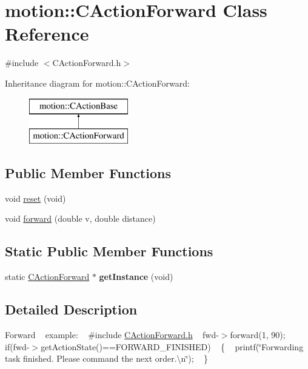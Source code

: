 \hypertarget{classmotion_1_1CActionForward}{}\section{motion\+:\+:C\+Action\+Forward Class Reference}
\label{classmotion_1_1CActionForward}


{\ttfamily \#include $<$C\+Action\+Forward.\+h$>$}

Inheritance diagram for motion\+:\+:C\+Action\+Forward\+:\begin{figure}[H]
\begin{center}
\leavevmode
\includegraphics[height=2.000000cm]{classmotion_1_1CActionForward}
\end{center}
\end{figure}
\subsection*{Public Member Functions}
\begin{DoxyCompactItemize}
\item 
void \mbox{\hyperlink{classmotion_1_1CActionForward_af7c72ffee0c2f41c8608259ef3268f23}{reset}} (void)
\item 
void \mbox{\hyperlink{classmotion_1_1CActionForward_abc4d3b39f49514f9d3f64a92393aa6d2}{forward}} (double v, double distance)
\end{DoxyCompactItemize}
\subsection*{Static Public Member Functions}
\begin{DoxyCompactItemize}
\item 
\mbox{\label{classmotion_1_1CActionForward_a7820340aa671aaf37c16b945f023b82f}} 
static \mbox{\hyperlink{classmotion_1_1CActionForward}{C\+Action\+Forward}} $\ast$ {\bfseries get\+Instance} (void)
\end{DoxyCompactItemize}


\subsection{Detailed Description}
Forward ~\newline
 example\+: ~\newline
 \#include \mbox{\hyperlink{CActionForward_8h}{C\+Action\+Forward.\+h}} ~\newline
 fwd-\/$>$forward(1, 90); ~\newline
if(fwd-\/$>$get\+Action\+State()==F\+O\+R\+W\+A\+R\+D\+\_\+\+F\+I\+N\+I\+S\+H\+ED) ~\newline
\{ ~\newline
 printf(\char`\"{}\+Forwarding task finished. Please command the next order.\textbackslash{}n\char`\"{}); ~\newline
\} 


